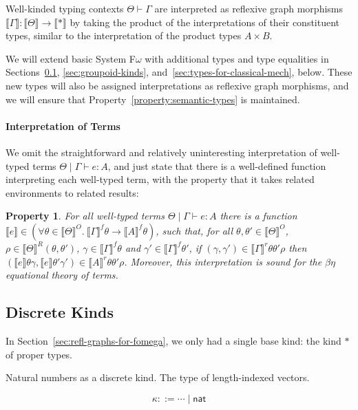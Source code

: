 \documentclass[preprint]{sigplanconf}
\newcommand{\sepbar}{\mathrel|}
\newtheorem{property}{Property}
\theoremstyle{examplestyle}
\newcommand{\sem}[1]{\llbracket #1 \rrbracket}
\newcommand{\semKU}[1]{\llbracket #1 \rrbracket^O}
\newcommand{\semKR}[1]{\llbracket #1 \rrbracket^R}
\begin{document}
Well-kinded typing contexts $\Theta \vdash \Gamma$ are interpreted as
reflexive graph morphisms $\sem{\Gamma} : \sem{\Theta} \to \sem{*}$ by
taking the product of the interpretations of their constituent types,
similar to the interpretation of the product types $A \times B$.

We will extend basic System F$\omega$ with additional types and type
equalities in Sections~\ref{sec:discrete-kinds},
\ref{sec:groupoid-kinds}, and~\ref{sec:types-for-classical-mech},
below. These new types will also be assigned interpretations as
reflexive graph morphisms, and we will ensure that
Property~\ref{property:semantic-types} is maintained.

\paragraph{Interpretation of Terms} We omit the straightforward and
relatively uninteresting interpretation of well-typed terms $\Theta
\sepbar \Gamma \vdash e : A$, and just state that there is a
well-defined function interpreting each well-typed term, with the
property that it takes related environments to related results:

\begin{property}
  For all well-typed terms $\Theta \sepbar \Gamma \vdash e : A$ there
  is a function $\sem{e} \in (\forall \theta \in \semKU{\Theta}.\
  \sem{\Gamma}^f\theta \to \sem{A}^f\theta)$, such that, for all
  $\theta, \theta' \in \semKU{\Theta}$, $\rho \in
  \semKR{\Theta}(\theta,\theta')$, $\gamma \in \sem{\Gamma}^f\theta$
  and $\gamma' \in \sem{\Gamma}^f\theta'$, if $(\gamma, \gamma') \in
  \sem{\Gamma}^r\theta\theta'\rho$ then $(\sem{e}\theta\gamma,
  \sem{e}\theta'\gamma') \in \sem{A}^r\theta\theta'\rho$.  Moreover,
  this interpretation is sound for the $\beta\eta$ equational theory
  of terms.
\end{property}

\subsection{Discrete Kinds}
\label{sec:discrete-kinds}

In Section~\ref{sec:refl-graphs-for-fomega}, we only had a single base
kind: the kind $*$ of proper types.

Natural numbers as a discrete kind. The type of length-indexed
vectors.

\begin{displaymath}
  \kappa ::= \cdots \sepbar \mathsf{nat}
\end{displaymath}
\end{document}
